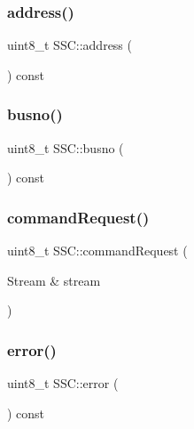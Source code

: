 \subsubsection{\texorpdfstring{address()}{address()}}
{\footnotesize\ttfamily uint8\+\_\+t S\+S\+C\+::address (\begin{DoxyParamCaption}{ }\end{DoxyParamCaption}) const\hspace{0.3cm}{\ttfamily [inline]}}

\mbox{\label{class_s_s_c_aaffcf87d61d2b2c2f7044bceaa00321c}} 
\subsubsection{\texorpdfstring{busno()}{busno()}}
{\footnotesize\ttfamily uint8\+\_\+t S\+S\+C\+::busno (\begin{DoxyParamCaption}{ }\end{DoxyParamCaption}) const\hspace{0.3cm}{\ttfamily [inline]}}

\mbox{\label{class_s_s_c_a6f3c30c9365fb70be3128dd8e7b372be}} 
\subsubsection{\texorpdfstring{command\+Request()}{commandRequest()}}
{\footnotesize\ttfamily uint8\+\_\+t S\+S\+C\+::command\+Request (\begin{DoxyParamCaption}\item[{Stream \&}]{stream }\end{DoxyParamCaption})}

\mbox{\label{class_s_s_c_a7ea76d501c90ac1c87cd6b1d87f988b1}} 
\subsubsection{\texorpdfstring{error()}{error()}}
{\footnotesize\ttfamily uint8\+\_\+t S\+S\+C\+::error (\begin{DoxyParamCaption}{ }\end{DoxyParamCaption}) const\hspace{0.3cm}{\ttfamily [inline]}}

